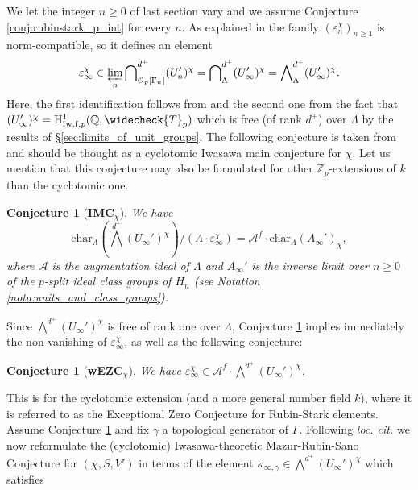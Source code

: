 \documentclass[12pt]{amsart}
\newcommand\bQ{\mathbb{Q}}
\newcommand\Zp{{\mathbb{Z}_p}}
\newcommand\cA{\mathcal{A}}
\newcommand\cO{\mathcal{O}}
\renewcommand{\char}{\textrm{char}}
\newcommand{\HH}{\mathrm{H}}
\newcommand{\ff}{\mathrm{f}}
\newcommand{\Iw}{\mathrm{Iw}}
\theoremstyle{defstyle}
\theoremstyle{thmstyle}
\newtheorem{conjecture}[subsubsection]{Conjecture}
\begin{document}
We let the integer $n\geq 0$ of last section vary and we assume Conjecture \ref{conj:rubinstark_p_int} for every $n$. As explained in \cite[3B2]{BKSANT} the family $(\varepsilon_n^\chi)_{n\geq 1}$ is norm-compatible, so it defines an element 
\begin{equation}\label{eq:family_RS}
	\varepsilon_\infty^\chi \in \varprojlim_n {\bigcap}^{d^+}_{\cO_p[\Gamma_n]} (U_n')^\chi = {\bigcap}^{d^+}_\Lambda (U_\infty')^\chi = {\bigwedge}^{d^+}_\Lambda (U_\infty')^\chi.
\end{equation}
Here, the first identification follows from \cite[Cor. B.5]{buyukboduksakamoto} and the second one from the fact that $(U_\infty')^\chi = \HH^1_{\Iw,\ff,p}(\bQ,\widecheck{T}_p)$ which is free (of rank $d^+$) over $\Lambda$ by the results of \S\ref{sec:limits_of_unit_groups}. The following conjecture is taken from \cite[Conj. 3.14]{BKSANT} and should be thought as a cyclotomic Iwasawa main conjecture for $\chi$. Let us mention that this conjecture may also be formulated for other $\Zp$-extensions of $k$ than the cyclotomic one.
\begin{conjecture}[\textbf{IMC}$_\chi$]\label{conj:IMC_chi}
	We have 
	$$\char_\Lambda \left({\bigwedge}^{d^+} (U_\infty')^\chi\right) \big/\left(\Lambda\cdot \varepsilon_\infty^\chi\right) = \cA^f \cdot \char_\Lambda (A_\infty')_\chi,$$
	where $\cA$ is the augmentation ideal of $\Lambda$ and  $A_\infty'$ is the inverse limit over $n\geq 0$ of the $p$-split ideal class groups of $H_n$ (see Notation \ref{nota:units_and_class_groups}).
\end{conjecture}
Since ${\bigwedge}^{d^+} (U_\infty')^\chi$ is free of rank one over $\Lambda$, Conjecture \ref{conj:IMC_chi} implies immediately the non-vanishing of $\varepsilon_\infty^\chi$, as well as the following conjecture:
\begin{conjecture}[\textbf{wEZC}$_\chi$]\label{conj:EZC_for_RS_elements}
	We have $\varepsilon_\infty^\chi \in \cA^f \cdot {\bigwedge}^{d^+} (U_\infty')^\chi$.
\end{conjecture}
This is \cite[Conj. 2.7]{buyukboduksakamoto} for the cyclotomic extension (and a more general number field $k$), where it is referred to as the Exceptional Zero Conjecture for Rubin-Stark elements. Assume Conjecture \ref{conj:EZC_for_RS_elements} and fix $\gamma$ a topological generator of $\Gamma$. Following \textit{loc. cit.} we now reformulate the (cyclotomic) Iwasawa-theoretic Mazur-Rubin-Sano Conjecture for $(\chi,S,V')$ in terms of the element $\kappa_{\infty,\gamma}\in{\bigwedge}^{d^+} (U_\infty')^\chi$ which satisfies 
\end{document}

